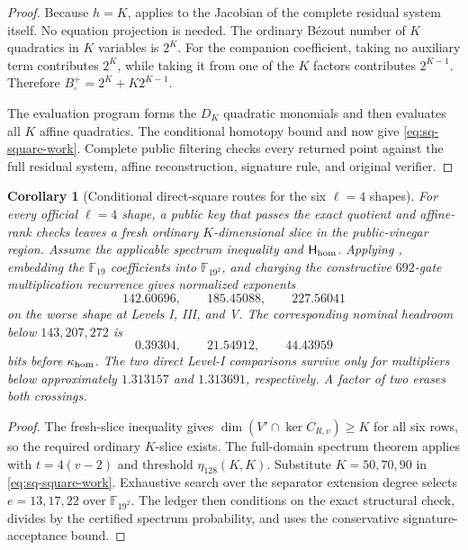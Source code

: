 \documentclass[11pt]{article}
\newtheorem{corollary}[theorem]{Corollary}
\newcommand{\F}{\mathbb F}
\begin{document}
\begin{proof}
Because $h=K$,  applies to the Jacobian of the
complete residual system itself.  No equation projection is needed.  The
ordinary B\'ezout number of $K$ quadratics in $K$ variables is $2^K$.  For the
companion coefficient, taking no auxiliary term contributes $2^K$, while
taking it from one of the $K$ factors contributes $2^{K-1}$.  Therefore
$B_\square^+=2^K+K2^{K-1}$.

The evaluation program forms the $D_K$ quadratic monomials and then evaluates
all $K$ affine quadratics.  The conditional homotopy bound and
 now give \eqref{eq:sq-square-work}.  Complete public
filtering checks every returned point against the full residual system,
affine reconstruction, signature rule, and original verifier.
\end{proof}

\begin{corollary}[Conditional direct-square routes for the six $\ell=4$ shapes]
\label{cor:sq-l4-direct-square}
For every official $\ell=4$ shape, a public key that passes the exact quotient
and affine-rank checks leaves a fresh ordinary $K$-dimensional slice in the
public-vinegar region.  Assume the applicable spectrum inequality and
$\mathsf H_{\rm hom}$.  Applying , embedding the
$\F_{19}$ coefficients into $\F_{19^2}$, and charging the constructive
$692$-gate multiplication recurrence gives normalized exponents
\[
 \boxed{142.60696,\qquad185.45088,\qquad227.56041}
\]
on the worse shape at Levels I, III, and V.  The corresponding nominal
headroom below $143,207,272$ is
\[
 \boxed{0.39304,\qquad21.54912,\qquad44.43959}
\]
bits before $\kappa_{\rm hom}$.  The two direct Level-I comparisons survive
only for multipliers below approximately $1.313157$ and $1.313691$,
respectively.  A factor of two erases both crossings.
\end{corollary}

\begin{proof}
The fresh-slice inequality gives
$\dim(V'\cap\ker C_{R,v})\ge K$ for all six rows, so the required ordinary
$K$-slice exists.  The full-domain spectrum theorem applies with $t=4(v-2)$
and threshold $\eta_{128}(K,K)$.  Substitute $K=50,70,90$ in
\eqref{eq:sq-square-work}.  Exhaustive search over the separator extension
degree selects $e=13,17,22$ over $\F_{19^2}$.  The ledger then conditions on
the exact structural check, divides by the certified spectrum probability,
and uses the conservative signature-acceptance bound.
\end{proof}
\end{document}

